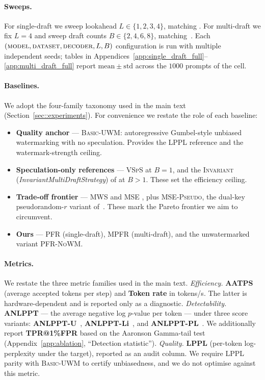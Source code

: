 \paragraph{Sweeps.}
For single-draft we sweep lookahead $L\in\{1,2,3,4\}$, matching
\citet{hu2024inevitable}.
For multi-draft we fix $L{=}4$ and sweep draft counts
$B\in\{2,4,6,8\}$, matching~\citet{rowan2025list}.
Each $(\textsc{model},\textsc{dataset},\textsc{decoder},L,B)$ configuration is
run with multiple independent seeds; tables in
Appendices~\ref{app:single_draft_full}--\ref{app:multi_draft_full} report
$\mathrm{mean}\pm\mathrm{std}$ across the $1000$ prompts of the cell.

\paragraph{Baselines.}
We adopt the four-family taxonomy used in the main text
(Section~\ref{sec::experiments}). For convenience we restate the role of each
baseline:
\begin{itemize}
  \item \textbf{Quality anchor} --- \textsc{Basic-UWM}: autoregressive
    Gumbel-style unbiased watermarking with no speculation. Provides the
    LPPL reference and the watermark-strength ceiling.
  \item \textbf{Speculation-only references} --- \textsc{VSpS}
    \citep{leviathan2023fast} at $B{=}1$, and the
    \textsc{Invariant} (\emph{InvariantMultiDraftStrategy}) of
    \citet{rowan2025list} at $B{>}1$. These set the efficiency ceiling.
  \item \textbf{Trade-off frontier} --- \textsc{MWS} and \textsc{MSE}
    \citep{hu2024inevitable}, plus \textsc{MSE-Pseudo}, the dual-key
    pseudorandom-$r$ variant of~\citet{he2026improving}. These mark the
    Pareto frontier we aim to circumvent.
  \item \textbf{Ours} --- \textsc{PFR} (single-draft), \textsc{MPFR}
    (multi-draft), and the unwatermarked variant \textsc{PFR-NoWM}.
\end{itemize}

\paragraph{Metrics.}
We restate the three metric families used in the main text.
\emph{Efficiency.} \textbf{AATPS} (average accepted tokens per step) and
\textbf{Token rate} in tokens/s. The latter is hardware-dependent and is
reported only as a diagnostic.
\emph{Detectability.} \textbf{ANLPPT} --- the average negative log $p$-value
per token --- under three score variants:
\textbf{ANLPPT-U}~\citep{aaronson2023watermarking, hu2024inevitable},
\textbf{ANLPPT-Li}~\citep{li2025statistical}, and
\textbf{ANLPPT-PL}~\citep{lattimore2026refined}.
We additionally report \textbf{TPR@1\%FPR} based on the Aaronson Gamma-tail
test (Appendix~\ref{app:ablation}, ``Detection statistic'').
\emph{Quality.} \textbf{LPPL} (per-token log-perplexity under the target),
reported as an audit column. We require LPPL parity with \textsc{Basic-UWM}
to certify unbiasedness, and we do not optimise against this metric.

